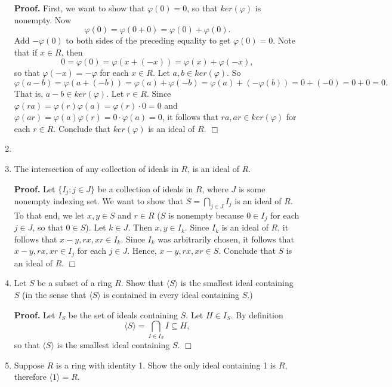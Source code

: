\documentclass[9pt]{article}
\newcommand{\qed}{\hfill \ensuremath{\Box}}
\newcommand{\cyc}[1]{\langle #1 \rangle}
\begin{document}
\begin{enumerate}
      \textbf{Proof.} First, we want to show that $\varphi(0) = 0$, so that
      $ker(\varphi)$ is nonempty. Now
      $$\varphi(0) = \varphi(0 + 0) = \varphi(0) + \varphi(0).$$
      Add $-\varphi(0)$ to both sides of the preceding equality to get
      $\varphi(0) = 0$. Note that if $x \in R$, then
      $$0 = \varphi(0) = \varphi(x + (-x)) = \varphi(x) + \varphi(-x),$$
      so that $\varphi(-x) = -\varphi$ for each $x \in R$.
      Let $a, b \in ker(\varphi)$. So
      $$\varphi(a - b) = \varphi(a + (-b)) = \varphi(a) + \varphi(-b) =
      \varphi(a) + (-\varphi(b)) = 0 + (-0) = 0  + 0 = 0.$$
      That is, $a - b \in ker(\varphi)$. Let $r \in R$. Since
      $\varphi(ra) = \varphi(r)\varphi(a) = \varphi(r)\cdot 0 = 0$ and
      $\varphi(ar) = \varphi(a)\varphi(r) = 0 \cdot\varphi(a) = 0$, it follows
      that $ra, ar \in ker(\varphi)$ for each $r \in R$. Conclude that
      $ker(\varphi)$ is an ideal of $R$. \qed
   \item 
   \item The intersection of any collection of ideals in $R$, is an ideal of
         $R$.
         
      \textbf{Proof.} Let $\{I_j : j \in J\}$ be a collection of ideals in $R$,
      where $J$ is some nonempty indexing set. We want to show that
      $S = \bigcap_{j \in J}I_j$ is an ideal of $R$. To that end, we let $x, y
      \in S$ and $r \in R$ ($S$ is nonempty because $0 \in I_j$ for each
      $j \in J$, so that $0 \in S$). Let $k \in J$. Then $x, y \in I_k$. Since
      $I_k$ is an ideal of $R$, it follows that $x - y, rx, xr \in I_k$. Since
      $I_k$ was arbitrarily chosen, it follows that $x - y, rx, xr \in I_j$ for
      each $j \in J$. Hence, $x - y, rx, xr \in S$. Conclude that $S$ is an
      ideal of $R$. \qed
   \item Let $S$ be a subset of a ring $R$. Show that $\cyc{S}$ is the smallest
         ideal containing $S$ (in the sense that $\cyc{S}$ is contained in
         every ideal containing $S$.)
         
      \textbf{Proof.} Let $I_S$ be the set of ideals containing $S$.
      Let $H \in I_S$. By definition
      $$\cyc{S} = \bigcap_{I \in I_S}I \subseteq H,$$
      so that $\cyc{S}$ is the smallest ideal containing $S$. \qed
   \item Suppose $R$ is a ring with identity 1. Show the only ideal containing
         1 is $R$, therefore $\cyc{1} = R$.
         

\end{enumerate}
\end{document}
